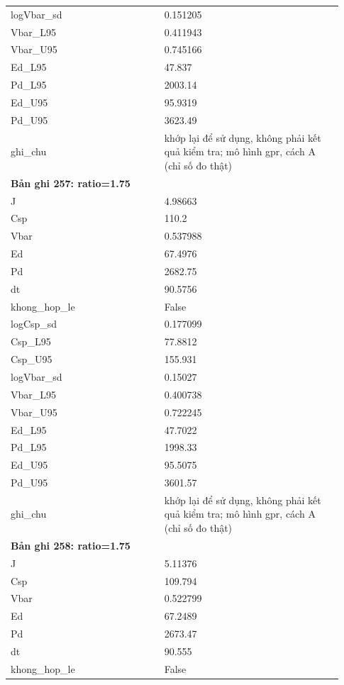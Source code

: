 \begin{longtable}{p{0.43\linewidth}p{0.50\linewidth}}
logVbar\_\allowbreak sd & 0.151205 \\
Vbar\_\allowbreak L95 & 0.411943 \\
Vbar\_\allowbreak U95 & 0.745166 \\
Ed\_\allowbreak L95 & 47.837 \\
Pd\_\allowbreak L95 & 2003.14 \\
Ed\_\allowbreak U95 & 95.9319 \\
Pd\_\allowbreak U95 & 3623.49 \\
ghi\_\allowbreak chu & khớp lại để sử dụng, không phải kết quả kiểm tra; mô hình gpr, cách A (chỉ số đo thật) \\
\midrule
\multicolumn{2}{p{0.95\linewidth}}{\textbf{Bản ghi 257: ratio=1.75}} \\
J & 4.98663 \\
Csp & 110.2 \\
Vbar & 0.537988 \\
Ed & 67.4976 \\
Pd & 2682.75 \\
dt & 90.5756 \\
khong\_\allowbreak hop\_\allowbreak le & False \\
logCsp\_\allowbreak sd & 0.177099 \\
Csp\_\allowbreak L95 & 77.8812 \\
Csp\_\allowbreak U95 & 155.931 \\
logVbar\_\allowbreak sd & 0.15027 \\
Vbar\_\allowbreak L95 & 0.400738 \\
Vbar\_\allowbreak U95 & 0.722245 \\
Ed\_\allowbreak L95 & 47.7022 \\
Pd\_\allowbreak L95 & 1998.33 \\
Ed\_\allowbreak U95 & 95.5075 \\
Pd\_\allowbreak U95 & 3601.57 \\
ghi\_\allowbreak chu & khớp lại để sử dụng, không phải kết quả kiểm tra; mô hình gpr, cách A (chỉ số đo thật) \\
\midrule
\multicolumn{2}{p{0.95\linewidth}}{\textbf{Bản ghi 258: ratio=1.75}} \\
J & 5.11376 \\
Csp & 109.794 \\
Vbar & 0.522799 \\
Ed & 67.2489 \\
Pd & 2673.47 \\
dt & 90.555 \\
khong\_\allowbreak hop\_\allowbreak le & False \\

\end{longtable}
